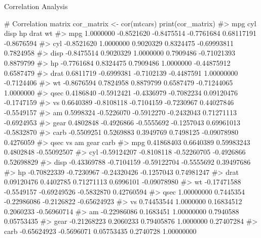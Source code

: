 \documentclass[
  18 pt,
  ignorenonframetext,
  aspectratio=1610,
]{beamer}
\newenvironment{Shaded}{\begin{snugshade}}{\end{snugshade}}
\newcommand{\CommentTok}[1]{\textcolor[rgb]{0.37,0.37,0.37}{#1}}
\newcommand{\FunctionTok}[1]{\textcolor[rgb]{0.28,0.35,0.67}{#1}}
\newcommand{\NormalTok}[1]{\textcolor[rgb]{0.00,0.23,0.31}{#1}}
\newcommand{\OtherTok}[1]{\textcolor[rgb]{0.00,0.23,0.31}{#1}}
\begin{document}
\begin{frame}[fragile]{Correlation Analysis}
\protect\hypertarget{correlation-analysis}{}
\tiny

\begin{Shaded}
\begin{Highlighting}[]
\CommentTok{\# Correlation matrix}
\NormalTok{cor\_matrix }\OtherTok{\textless{}{-}} \FunctionTok{cor}\NormalTok{(mtcars)}
\FunctionTok{print}\NormalTok{(cor\_matrix)}
\CommentTok{\#\textgreater{}             mpg        cyl       disp         hp        drat         wt}
\CommentTok{\#\textgreater{} mpg   1.0000000 {-}0.8521620 {-}0.8475514 {-}0.7761684  0.68117191 {-}0.8676594}
\CommentTok{\#\textgreater{} cyl  {-}0.8521620  1.0000000  0.9020329  0.8324475 {-}0.69993811  0.7824958}
\CommentTok{\#\textgreater{} disp {-}0.8475514  0.9020329  1.0000000  0.7909486 {-}0.71021393  0.8879799}
\CommentTok{\#\textgreater{} hp   {-}0.7761684  0.8324475  0.7909486  1.0000000 {-}0.44875912  0.6587479}
\CommentTok{\#\textgreater{} drat  0.6811719 {-}0.6999381 {-}0.7102139 {-}0.4487591  1.00000000 {-}0.7124406}
\CommentTok{\#\textgreater{} wt   {-}0.8676594  0.7824958  0.8879799  0.6587479 {-}0.71244065  1.0000000}
\CommentTok{\#\textgreater{} qsec  0.4186840 {-}0.5912421 {-}0.4336979 {-}0.7082234  0.09120476 {-}0.1747159}
\CommentTok{\#\textgreater{} vs    0.6640389 {-}0.8108118 {-}0.7104159 {-}0.7230967  0.44027846 {-}0.5549157}
\CommentTok{\#\textgreater{} am    0.5998324 {-}0.5226070 {-}0.5912270 {-}0.2432043  0.71271113 {-}0.6924953}
\CommentTok{\#\textgreater{} gear  0.4802848 {-}0.4926866 {-}0.5555692 {-}0.1257043  0.69961013 {-}0.5832870}
\CommentTok{\#\textgreater{} carb {-}0.5509251  0.5269883  0.3949769  0.7498125 {-}0.09078980  0.4276059}
\CommentTok{\#\textgreater{}             qsec         vs          am       gear        carb}
\CommentTok{\#\textgreater{} mpg   0.41868403  0.6640389  0.59983243  0.4802848 {-}0.55092507}
\CommentTok{\#\textgreater{} cyl  {-}0.59124207 {-}0.8108118 {-}0.52260705 {-}0.4926866  0.52698829}
\CommentTok{\#\textgreater{} disp {-}0.43369788 {-}0.7104159 {-}0.59122704 {-}0.5555692  0.39497686}
\CommentTok{\#\textgreater{} hp   {-}0.70822339 {-}0.7230967 {-}0.24320426 {-}0.1257043  0.74981247}
\CommentTok{\#\textgreater{} drat  0.09120476  0.4402785  0.71271113  0.6996101 {-}0.09078980}
\CommentTok{\#\textgreater{} wt   {-}0.17471588 {-}0.5549157 {-}0.69249526 {-}0.5832870  0.42760594}
\CommentTok{\#\textgreater{} qsec  1.00000000  0.7445354 {-}0.22986086 {-}0.2126822 {-}0.65624923}
\CommentTok{\#\textgreater{} vs    0.74453544  1.0000000  0.16834512  0.2060233 {-}0.56960714}
\CommentTok{\#\textgreater{} am   {-}0.22986086  0.1683451  1.00000000  0.7940588  0.05753435}
\CommentTok{\#\textgreater{} gear {-}0.21268223  0.2060233  0.79405876  1.0000000  0.27407284}
\CommentTok{\#\textgreater{} carb {-}0.65624923 {-}0.5696071  0.05753435  0.2740728  1.00000000}
\end{Highlighting}
\end{Shaded}
\end{frame}
\end{document}
